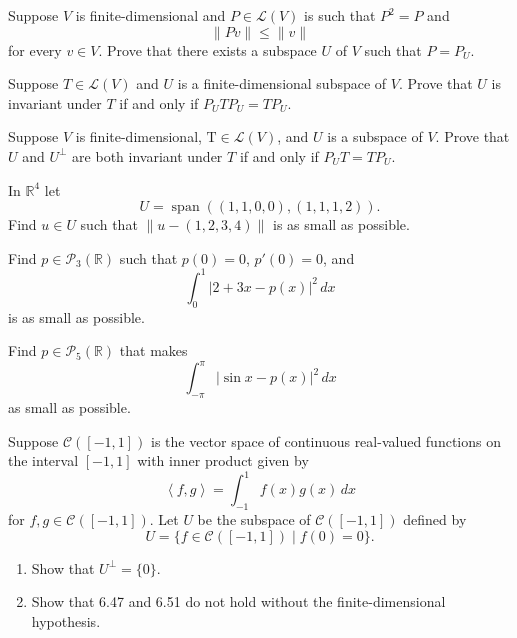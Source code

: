 \documentclass[12 pt, letterpaper]{hmcpset}
\begin{document}
\pagebreak

\begin{problem}[8]
	Suppose $V$ is finite-dimensional and $P \in \mathcal{L}(V)$ is such that $P^{2} = P$ and
	\[
		\lVert Pv \rVert \le \lVert v \rVert
	\]
	for every $v \in V$. Prove that there exists a subspace $U$ of $V$ such that $P = P_{U}$.
\end{problem}

\pagebreak

\begin{problem}[9]
	Suppose $T \in \mathcal{L}(V)$ and $U$ is a finite-dimensional subspace of $V$. Prove that $U$ is invariant under $T$ if and only if $P_{U} T P_{U} = T P_{U}$.
\end{problem}

\pagebreak

\begin{problem}[10]
	Suppose $V$ is finite-dimensional, $\mathrm{T} \in \mathcal{L}(V)$, and $U$ is a subspace of $V$. Prove that $U$ and $U^{\perp}$ are both invariant under $T$ if and only if $P_{U} T = T P_{U}$.
\end{problem}

\pagebreak

\begin{problem}[11]
	In $\mathbb{R}^{4}$ let
	 \[
		U = \operatorname{span}((1, 1, 0, 0), (1, 1, 1, 2)).
	\]
	Find $u \in U$ such that $\lVert u - (1, 2, 3, 4) \rVert$ is as small as possible.
\end{problem}

\pagebreak

\begin{problem}[12]
	Find $p \in \mathcal{P}_{3}(\mathbb{R})$ such that $p(0) = 0$, $p'(0) = 0$, and
	\[
		\int_{0}^{1} \lvert 2 + 3x - p(x) \rvert^{2} \, dx 
	\]
	is as small as possible.
\end{problem}

\pagebreak

\begin{problem}[13]
	Find $p \in \mathcal{P}_{5}(\mathbb{R})$ that makes
	\[
		\int_{- \pi}^{\pi} \lvert \sin{x} - p(x) \rvert^{2} \, dx 
	\]
	as small as possible.
\end{problem}

\pagebreak

\begin{problem}[14]
	Suppose $\mathcal{C}([-1, 1])$ is the vector space of continuous real-valued functions on the interval $[-1, 1]$ with inner product given by
	\[
		\left < f, g \right > = \int_{-1}^{1} f(x) g(x) \, dx 
	\]
	for $f, g \in \mathcal{C}([-1, 1])$. Let $U$ be the subspace of $\mathcal{C}([-1, 1])$ defined by
	 \[
		U = \{ f \in \mathcal{C}([-1, 1]) \mid f(0) = 0 \}.
	\]
	\begin{enumerate}
		\item Show that $U^{\perp} = \{ 0 \}$.
		\item Show that 6.47 and 6.51 do not hold without the finite-dimensional hypothesis.
	\end{enumerate}
\end{problem}
\end{document}
